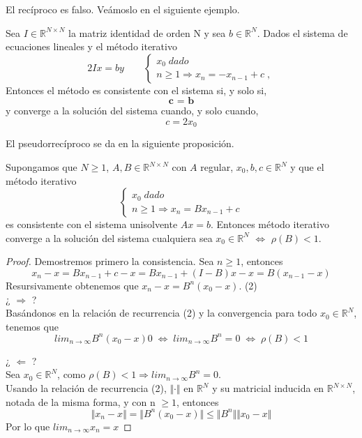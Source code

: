 El recíproco es falso. Veámoslo en el siguiente ejemplo.

\begin{ejemplo} Sea $I \in \mathbb{R}^{N \times N}$ la matriz identidad de orden N y sea $b \in \mathbb{R}^N$. Dados el sistema de ecuaciones lineales y el método iterativo
\[
2Ix = b y \qquad \left\{ \begin{array}{c}
x_0 \; dado \\
n \geq 1 \Rightarrow x_n = -x_{n-1}+c \; ,
\end{array}
\right.
\]
Entonces el método es consistente con el sistema si, y solo si,
\[ \textbf{c = b} \]
y converge a la solución del sistema cuando, y solo cuando,
\[ c = 2x_0 \]
\end{ejemplo}

El pseudorrecíproco se da en la siguiente proposición.

\begin{nprop}
Supongamos que $N \geq 1$, $A,B \in \mathbb{R}^{N \times N}$ con $A$ regular, $x_0,b,c \in \mathbb{R}^N$ y que el método iterativo
\[ \left\{ \begin{array}{c}
x_0 \; dado \\
n \geq 1 \Rightarrow x_n = Bx_{n-1}+c
\end{array}
\right. \]
es consistente con el sistema unisolvente $Ax = b$. Entonces método iterativo converge a la solución del sistema cualquiera sea $x_0 \in \mathbb{R}^N$ $\Leftrightarrow$ $\rho (B) < 1$.
\end{nprop}

	\begin{proof}
	Demostremos primero la consistencia. Sea $n \geq 1$, entonces
	\[ x_n - x = Bx_{n-1} + c - x = Bx_{n-1} + (I - B)x - x = B(x_{n-1} - x) \]
	Resursivamente obtenemos que $x_n - x = B^n (x_0 - x)$. (2)\\
	¿ $\Rightarrow$ ?\\
	Basándonos en la relación de recurrencia (2) y la convergencia para todo $x_0 \in \mathbb{R}^N$, tenemos que
	\[ lim_{n \rightarrow \infty} B^n(x_0 - x) 0 
	\; \Leftrightarrow \; 
	lim_{n \rightarrow \infty} B^n = 0
	\; \Leftrightarrow \;
	\rho (B) < 1 \]
	
	¿ $\Leftarrow$ ?\\
	Sea $x_0 \in \mathbb{R}^N$, como $\rho (B) < 1 \Rightarrow lim_{n \rightarrow \infty} B^n = 0$.\\
	Usando la relación de recurrencia (2), $\Vert \cdot \Vert$ en $\mathbb{R}^N$ y su matricial inducida en $\mathbb{R}^{N \times N}$, notada de la misma forma, y con n $\geq 1$, entonces
	\[ \Vert x_n - x \Vert = \Vert B^n(x_0-x) \Vert \leq \Vert B^n \Vert \Vert x_0 - x \Vert \]
	Por lo que $lim_{n \rightarrow \infty}x_n = x$
	\end{proof}
	
